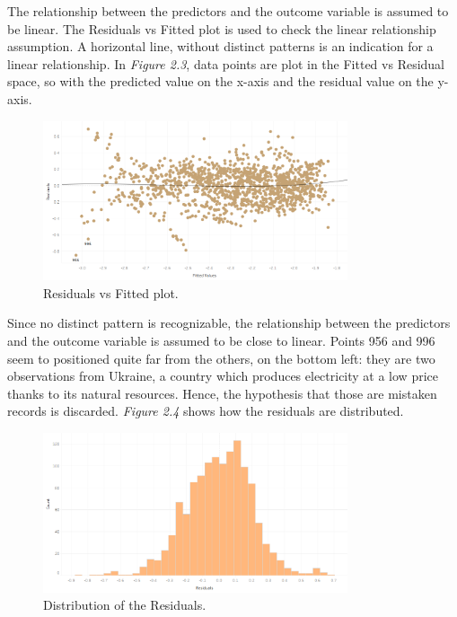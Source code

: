 \documentclass{book}
\begin{document}
The relationship between the predictors and the outcome variable is assumed to be linear. The Residuals vs Fitted plot is used to check the linear relationship assumption. A horizontal line, without distinct patterns is an indication for a linear relationship. In \textit{Figure 2.3}, data points are plot in the Fitted vs Residual space, so with the predicted value on the x-axis and the residual value on the y-axis.

\bigskip
\begin{figure}[H]
\begin{center}
\captionsetup{justification=centering}
\includegraphics[width=0.8\textwidth]{Images/fitres.png}
\caption{Residuals vs Fitted plot.}
\end{center}
\end{figure}
\bigskip

Since no distinct pattern is recognizable, the relationship between the predictors and the outcome variable is assumed to be close to linear. Points 956 and 996 seem to positioned quite far from the others, on the bottom left: they are two observations from Ukraine, a country which produces electricity at a low price thanks to its natural resources. Hence, the hypothesis that those are mistaken records is discarded. \textit{Figure 2.4} shows how the residuals are distributed.

\bigskip
\begin{figure}[H]
\begin{center}
\captionsetup{justification=centering}
\includegraphics[width=0.8\textwidth]{Images/distres.png}
\caption{Distribution of the Residuals.}
\end{center}
\end{figure}
\bigskip
\end{document}
